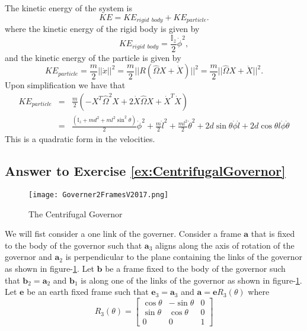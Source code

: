 \documentclass[graybox,envcountchap,sectrefs]{svmonoMuga}
\begin{document}
The kinetic energy of the system is
\[
KE=KE_{rigid\:\:body}+KE_{particle}.
\]
where the kinetic energy of the rigid body is given by
\[
KE_{rigid\:\:body}=\frac{\mathbb{I}_z}{2}\dot{\phi}^2,
\]
and the kinetic energy of the particle is given by
\[
KE_{particle}=\frac{m}{2}||\dot{x}||^2=\frac{m}{2}||R(\widehat{\Omega}X+\dot{X})||^2=\frac{m}{2}||\widehat{\Omega}X+\dot{X}||^2.
\]
Upon simplification we have that
\begin{eqnarray*}
KE_{particle} & = &\frac{m}{2}\left( -X^T\widehat{\Omega}^2X+2\dot{X}\widehat{\Omega}X+\dot{X}^T\dot{X}\right)\\
& = & \frac{(\mathbb{I}_z+md^2+ml^2\sin^2{\theta})}{2}\dot{\phi}^2+\frac{m}{2}\dot{l}^2+\frac{ml^2}{2}\dot{\theta}^2 +2d \sin{\theta}\dot{\phi}\dot{l}+2d \cos{\theta}l\dot{\phi}\dot{\theta}
\end{eqnarray*}
This is a quadratic form in the velocities.
\subsection*{Answer to Exercise \ref{ex:CentrifugalGovernor}}

\begin{figure}[hbtp]
  \begin{center}
  \texttt{[image: Governer2FramesV2017.png]}
  \caption{The Centrifugal Governor}
  \label{fig:governer}
  \end{center}
\end{figure}
We will fist consider a one link of the governer.
Consider a frame $\mathbf{a}$ that is fixed to the body of the governor such that $\mathbf{a}_3$ aligns along the axis of rotation of the governor and $\mathbf{a}_2$ is perpendicular to the plane containing the links of the governor as shown in figure-\ref{fig:governer}.  Let $\mathbf{b}$ be a frame fixed to the body of the governor such that $\mathbf{b}_2=\mathbf{a}_2$ and $\mathbf{b}_1$ is along one of the links of the governor as shown in figure-\ref{fig:governer}. Let $\mathbf{e}$ be an earth fixed frame such that $\mathbf{e}_3=\mathbf{a}_3$ and $\mathbf{a}=\mathbf{e}R_3(\theta)$ where
\[
  R_3(\theta)= 
  \left[\begin{matrix}
  \cos\theta & -\sin\theta & 0 \\
  \sin\theta & \cos\theta & 0 \\
  0 & 0 & 1
 \end{matrix}\right]
\]\\
\end{document}
